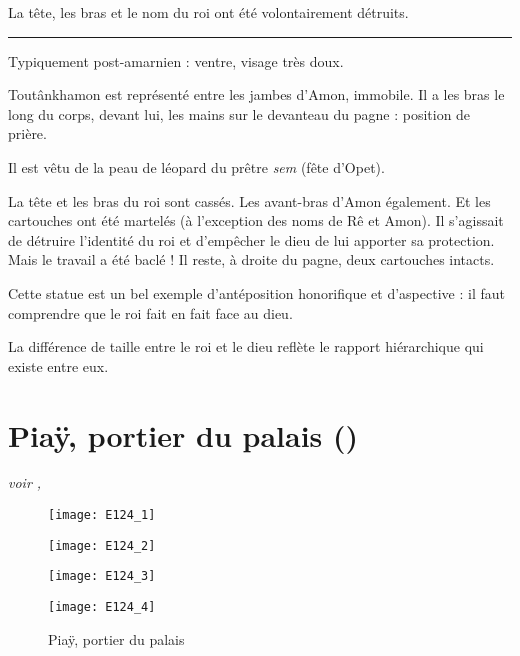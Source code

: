 \documentclass[dvipsnames,a4paper,twoside,10pt,openany,article]{memoir}
\newcommand{\separation}{%
  {\noi\hspace*{\fill}\rule{.33\textwidth}{1pt}\hspace*{\fill}}%
}
\begin{document}
La tête, les bras et le nom du roi ont été volontairement détruits.

\separation

Typiquement post-amarnien : ventre, visage très doux.

Toutânkhamon est représenté entre les jambes d'Amon, immobile. Il a 
les bras le long du corps, devant lui, les mains sur le devanteau du 
pagne : position de prière.

Il est vêtu de la peau de léopard du prêtre \emph{sem} (fête d'Opet). 

La tête et les bras du roi sont cassés. Les avant-bras d'Amon 
également. Et les cartouches ont été martelés (à l'exception des 
noms de Rê et Amon). Il s'agissait de détruire l'identité du roi et 
d'empêcher le dieu de lui apporter sa protection. Mais le travail a 
été baclé ! Il reste, à droite du pagne, deux cartouches intacts.

Cette statue est un bel exemple d'antéposition honorifique et d'aspective  : il faut comprendre que le roi fait en fait face au dieu.

La différence de taille entre le roi et le dieu reflète le rapport 
hiérarchique qui existe entre eux.


\chapter{Piaÿ, portier du palais ()}
\label{sec:E124}

\puceb{} \emph{voir , }
\bigskip

\begin{figure}[!h]
  \noi\begin{minipage}[m]{0.50\textwidth}
    \centerfloat
    \texttt{[image: E124\_1]}
  \end{minipage}%
  \hspace{\fill}%
  \begin{minipage}[m]{0.50\textwidth}
    \centerfloat
    \texttt{[image: E124\_2]}
  \end{minipage}%

  \noi\begin{minipage}[m]{0.50\textwidth}
    \centerfloat
    \texttt{[image: E124\_3]}
  \end{minipage}%
  \hspace{\fill}%
  \begin{minipage}[m]{0.50\textwidth}
    \centerfloat
    \texttt{[image: E124\_4]}
  \end{minipage}%
  \caption{Piaÿ, portier du palais }
  \label{fig:E124}
\end{figure}
\end{document}
